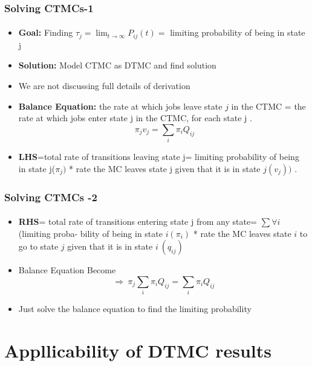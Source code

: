 \documentclass{beamer}
\begin{document}
\begin{frame} 
\frametitle{Solving CTMCs-1 }
\framesubtitle{\textbf{\textit{}}}
\begin{itemize}
\item \textbf{Goal:} Finding $\tau_j = \lim_{t \rightarrow \infty} P_{ij} (t) =$ limiting probability of being in state j
\item \textbf{Solution:} Model CTMC as DTMC and find solution
\item We are not discussing full details of derivation
\item \textbf{Balance Equation:}  the rate at which jobs leave state $j$ in the CTMC =  the rate at which jobs enter state j in the CTMC, for each state j .
$$\: \pi_j v_j = \sum_i \pi_i Q_{ij} $$
\item  \textbf{LHS}=total rate of transitions leaving state j= limiting probability of being in state j($\pi_j) $ * rate the MC leaves state j given that it is in state $j (v_j))$ .


\end{itemize}

\end{frame}


\begin{frame} 
\frametitle{Solving CTMCs -2}
\framesubtitle{\textbf{\textit{}}}
\begin{itemize}

\item \textbf{RHS}= total rate
of transitions entering state j from any state= $\sum \forall i $ (limiting proba-
bility of being in state $i (\pi_i)$ *   rate the MC leaves state $i$ to go to state $j$ given that it is in state $i \: ( q_{ij})$  

\item Balance Equation Become
$$ \Rightarrow \: \pi_j \sum_i \pi_i Q_{ij} = \sum_i \pi_i Q_{ij} $$

\item Just solve the balance equation to find the limiting probability
\end{itemize}

\end{frame}

\section{Appllicability of DTMC results}
\end{document}
